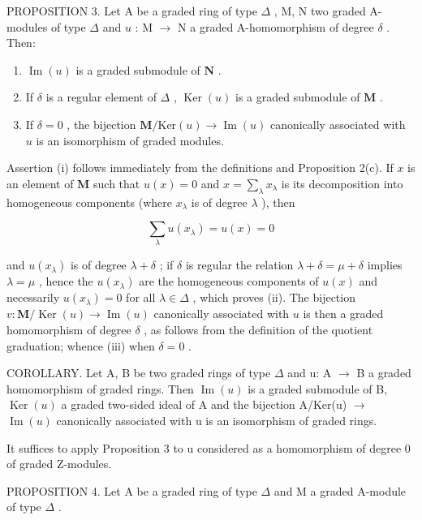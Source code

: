 PROPOSITION 3. Let A be a graded ring of type \(\Delta\) , M, N two graded A-modules of type \(\Delta\) and \(u\) : M \(\rightarrow\) N a graded A-homomorphism of degree \(\delta\) . Then:

\begin{enumerate}
\def\labelenumi{(\roman{enumi})}
\item
  \(\operatorname{Im}(u)\) is a graded submodule of \(\mathbf{N}\) .
\item
  If \(\delta\) is a regular element of \(\Delta\) , \(\operatorname{Ker}(u)\) is a graded submodule of \(\mathbf{M}\) .
\item
  If \(\delta = 0\) , the bijection \(\mathbf{M} / \mathrm{Ker}(u) \to \operatorname{Im}(u)\) canonically associated with \(u\) is an isomorphism of graded modules.
\end{enumerate}

Assertion (i) follows immediately from the definitions and Proposition 2(c). If \(x\) is an element of \(\mathbf{M}\) such that \(u(x) = 0\) and \(x = \sum_{\lambda} x_{\lambda}\) is its decomposition into homogeneous components (where \(x_{\lambda}\) is of degree \(\lambda\) ), then

\[
\sum_ {\lambda} u (x _ {\lambda}) = u (x) = 0
\]

and \(u(x_{\lambda})\) is of degree \(\lambda + \delta\) ; if \(\delta\) is regular the relation \(\lambda + \delta = \mu + \delta\) implies \(\lambda = \mu\) , hence the \(u(x_{\lambda})\) are the homogeneous components of \(u(x)\) and necessarily \(u(x_{\lambda}) = 0\) for all \(\lambda \in \Delta\) , which proves (ii). The bijection \(v: \mathbf{M} / \operatorname{Ker}(u) \to \operatorname{Im}(u)\) canonically associated with \(u\) is then a graded homomorphism of degree \(\delta\) , as follows from the definition of the quotient graduation; whence (iii) when \(\delta = 0\) .

COROLLARY. Let A, B be two graded rings of type \(\Delta\) and u: A \(\rightarrow\) B a graded homomorphism of graded rings. Then \(\operatorname{Im}(u)\) is a graded submodule of B, \(\operatorname{Ker}(u)\) a graded two-sided ideal of A and the bijection A/Ker(u) \(\rightarrow\) \(\operatorname{Im}(u)\) canonically associated with u is an isomorphism of graded rings.

It suffices to apply Proposition 3 to u considered as a homomorphism of degree 0 of graded Z-modules.

PROPOSITION 4. Let A be a graded ring of type \(\Delta\) and M a graded A-module of type \(\Delta\) .

